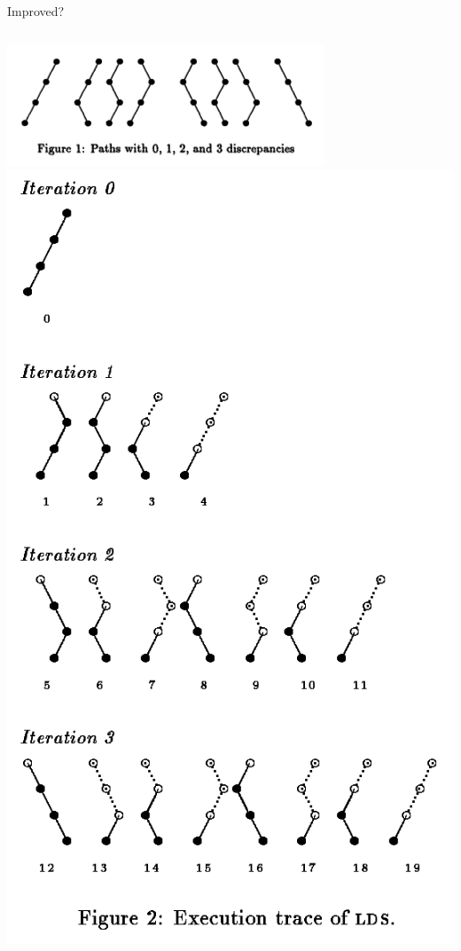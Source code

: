 \documentclass{beamer}
\begin{document}
\begin{frame}{Improved?}
    \begin{columns}
        \centering\includegraphics*[keepaspectratio=true,scale=0.4]{images/ilds-paths.png}
        \centering\includegraphics*[keepaspectratio=true,scale=0.18]{images/lds-tree.png}
    \end{columns}

\end{frame}
\end{document}
